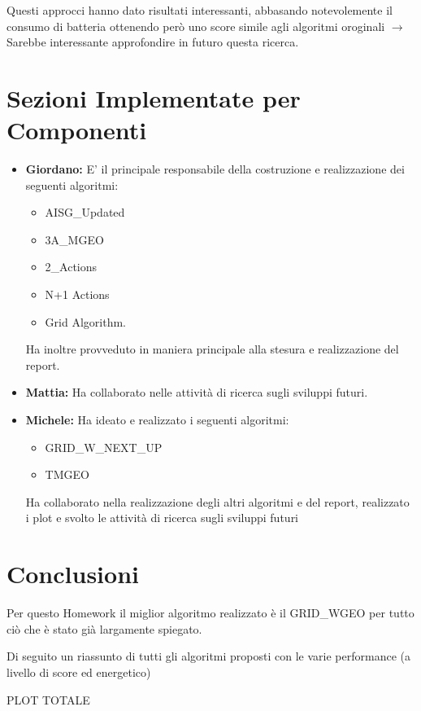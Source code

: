 \documentclass[12pt]{article}
\begin{document}
Questi approcci hanno dato risultati interessanti, abbasando notevolemente il consumo di batteria ottenendo però uno score simile agli algoritmi oroginali $\rightarrow$ Sarebbe interessante approfondire in futuro questa ricerca.


\section{Sezioni Implementate per Componenti}

\begin{itemize}

    \item \textbf{Giordano:} E' il principale responsabile della costruzione e realizzazione dei seguenti algoritmi:
    
    \begin{itemize}
        
        \item AISG\_Updated
        
        \item 3A\_MGEO
        
        \item 2\_Actions
        
        \item N+1 Actions
        
        \item Grid Algorithm. 
        
    \end{itemize}
    
    Ha inoltre provveduto in maniera principale alla stesura e realizzazione del report.
    
    \item \textbf{Mattia:} Ha collaborato nelle attività di ricerca sugli sviluppi futuri.
    
    \item \textbf{Michele:} Ha ideato e realizzato i seguenti algoritmi:
        \begin{itemize}
        
		\item	GRID\_W\_NEXT\_UP
	
		\item	TMGEO
		 
	\end{itemize}
		Ha collaborato nella realizzazione degli altri algoritmi e del report, realizzato i plot e svolto le attività di ricerca sugli sviluppi futuri
    
    
\end{itemize}

\section{Conclusioni}

Per questo Homework il miglior algoritmo realizzato è il GRID\_WGEO per tutto ciò che è stato già largamente spiegato.

Di seguito un riassunto di tutti gli algoritmi proposti con le varie performance (a livello di score ed energetico)

PLOT TOTALE
\end{document}
